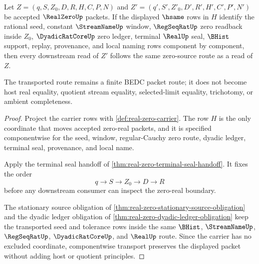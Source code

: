 \begin{theorem}
\label{thm:real-zero-componentwise-transport}
Let $Z=(q,S,Z_0,D,R,H,C,P,N)$ and $Z'=(q',S',Z'_0,D',R',H',C',P',N')$ be accepted $\RealZeroUp$ packets. If the displayed $\hsame$ rows in $H$ identify the rational seed, constant $\StreamNameUp$ window, $\RegSeqRatUp$ zero readback inside $Z_0$, $\DyadicRatCoreUp$ zero ledger, terminal $\RealUp$ seal, $\BHist$ support, replay, provenance, and local naming rows component by component, then every downstream read of $Z'$ follows the same zero-source route as a read of $Z$.

The transported route remains a finite BEDC packet route; it does not become host real equality, quotient stream equality, selected-limit equality, trichotomy, or ambient completeness.
\end{theorem}
\begin{proof}
Project the carrier rows with \autoref{def:real-zero-carrier}. The row $H$ is the only coordinate that moves accepted zero-real packets, and it is specified componentwise for the seed, window, regular-Cauchy zero route, dyadic ledger, terminal seal, provenance, and local name.

Apply the terminal seal handoff of \autoref{thm:real-zero-terminal-seal-handoff}. It fixes the order
$$
q \longrightarrow S \longrightarrow Z_0 \longrightarrow D \longrightarrow R
$$
before any downstream consumer can inspect the zero-real boundary.

The stationary source obligation of \autoref{thm:real-zero-stationary-source-obligation} and the dyadic ledger obligation of \autoref{thm:real-zero-dyadic-ledger-obligation} keep the transported seed and tolerance rows inside the same $\BHist$, $\StreamNameUp$, $\RegSeqRatUp$, $\DyadicRatCoreUp$, and $\RealUp$ route. Since the carrier has no excluded coordinate, componentwise transport preserves the displayed packet without adding host or quotient principles.
\end{proof}


